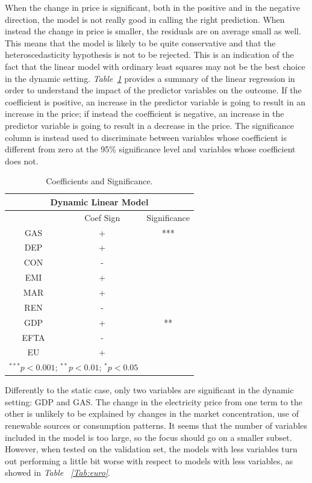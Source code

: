 \documentclass[a4paper,12pt]{book}
\begin{document}
When the change in price is significant, both in the positive and in the negative direction, the model is not really good in calling the right prediction. When instead the change in price is smaller, the residuals are on average small as well. This means that the model is likely to be quite conservative and that the heteroscedasticity hypothesis is not to be rejected. This is an indication of the fact that the linear model with ordinary least squares may not be the best choice in the dynamic setting. \textit{Table~\ref{Tab:dlm}} provides a summary of the linear regression in order to understand the impact of the predictor variables on the outcome. If the coefficient is positive, an increase in the predictor variable is going to result in an increase in the price; if instead the coefficient is negative, an increase in the predictor variable is going to result in a decrease in the price. The significance column is instead used to discriminate between variables whose coefficient is different from zero at the 95\% significance level and variables whose coefficient does not.

\begin{table}[tb]
\begin{center}
\begin{tabular}{|c|c|c|}
\hline
\multicolumn{3}{|c|}{Dynamic Linear Model}\\
\hline
&Coef Sign&Significance\\
\hline
GAS&+&***\\
DEP&+&\\
CON&-&\\
EMI&+&\\
MAR&+&\\
REN&-&\\
GDP&+&**\\
EFTA&-&\\
EU&+&\\
\hline
\multicolumn{2}{l}{\scriptsize{$^{***}p<0.001$; $^{**}p<0.01$; $^{*}p<0.05$}}
\end{tabular}
\caption{Coefficients and Significance.}
\label{Tab:dlm}
\end{center}
\end{table}

Differently to the static case, only two variables are significant in the dynamic setting: GDP and GAS. The change in the electricity price from one term to the other is unlikely to be explained by changes in the market concentration, use of renewable sources or consumption patterns. It seems that the number of variables included in the model is too large, so the focus should go on a smaller subset. However, when tested on the validation set, the models with less variables turn out performing a little bit worse with respect to models with less variables, as showed in \textit{Table ~\ref{Tab:euro}}.
\end{document}
